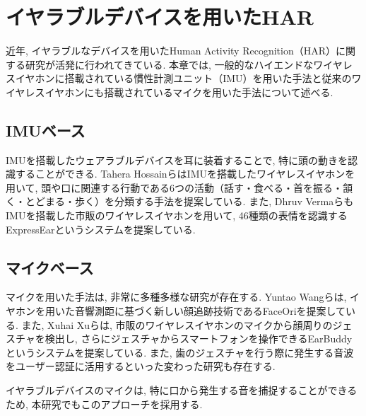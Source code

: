 \section{イヤラブルデバイスを用いたHAR}

近年, イヤラブルなデバイスを用いたHuman Activity Recognition（HAR）に関する研究が活発に行われてきている. 本章では, 一般的なハイエンドなワイヤレスイヤホンに搭載されている慣性計測ユニット（IMU）を用いた手法と従来のワイヤレスイヤホンにも搭載されているマイクを用いた手法について述べる.

\subsection{IMUベース}

IMUを搭載したウェアラブルデバイスを耳に装着することで, 特に頭の動きを認識することができる. Tahera HossainらはIMUを搭載したワイヤレスイヤホンを用いて, 頭や口に関連する行動である6つの活動（話す・食べる・首を振る・頷く・とどまる・歩く）を分類する手法を提案している\cite{10.1145/3341162.3343822}. また, Dhruv VermaらもIMUを搭載した市販のワイヤレスイヤホンを用いて, 46種類の表情を認識するExpressEarというシステムを提案している\cite{10.1145/3478085}.

\subsection{マイクベース}

マイクを用いた手法は, 非常に多種多様な研究が存在する. Yuntao Wangらは, イヤホンを用いた音響測距に基づく新しい顔追跡技術であるFaceOriを提案している\cite{10.1145/3491102.3517698}. また, Xuhai Xuらは, 市販のワイヤレスイヤホンのマイクから顔周りのジェスチャを検出し, さらにジェスチャからスマートフォンを操作できるEarBuddyというシステムを提案している\cite{10.1145/3313831.3376836}. また, 歯のジェスチャを行う際に発生する音波をユーザー認証に活用するといった変わった研究も存在する\cite{10.1145/3460120.3485340}.

イヤラブルデバイスのマイクは, 特に口から発生する音を捕捉することができるため, 本研究でもこのアプローチを採用する.

